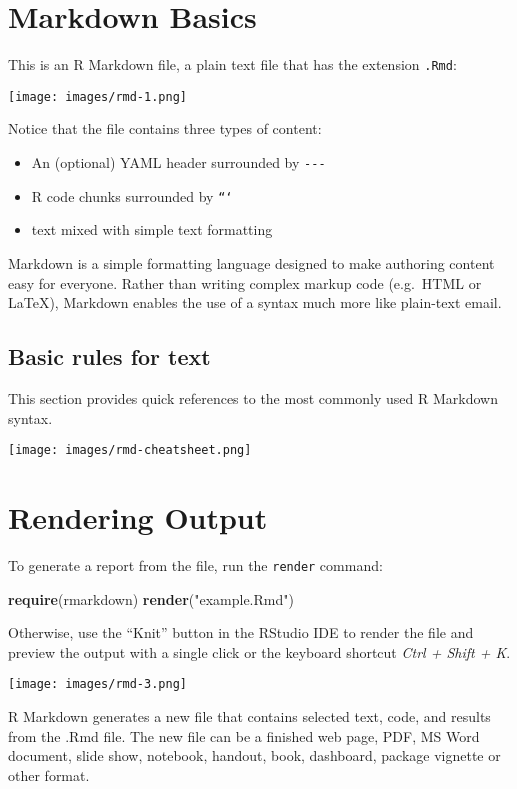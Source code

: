 \documentclass[]{book}
\newenvironment{Shaded}{\begin{snugshade}}{\end{snugshade}}
\newcommand{\KeywordTok}[1]{\textcolor[rgb]{0.13,0.29,0.53}{\textbf{{#1}}}}
\newcommand{\StringTok}[1]{\textcolor[rgb]{0.31,0.60,0.02}{{#1}}}
\newcommand{\NormalTok}[1]{{#1}}
\providecommand{\tightlist}{%
  \setlength{\itemsep}{0pt}\setlength{\parskip}{0pt}}
\def\tightlist{}
\begin{document}
\section{Markdown Basics}\label{markdown-basics}

This is an R Markdown file, a plain text file that has the extension
\texttt{.Rmd}:

\texttt{[image: images/rmd-1.png]}

Notice that the file contains three types of content:

\begin{itemize}
\tightlist
\item
  An (optional) YAML header surrounded by \texttt{-\/-\/-}
\item
  R code chunks surrounded by \texttt{```}
\item
  text mixed with simple text formatting
\end{itemize}

Markdown is a simple formatting language designed to make authoring
content easy for everyone. Rather than writing complex markup code
(e.g.~HTML or LaTeX), Markdown enables the use of a syntax much more
like plain-text email.

\subsection{Basic rules for text}\label{basic-rules-for-text}

This section provides quick references to the most commonly used R
Markdown syntax.

\texttt{[image: images/rmd-cheatsheet.png]}

\section{Rendering Output}\label{rendering-output}

To generate a report from the file, run the \texttt{render} command:

\begin{Shaded}
\begin{Highlighting}[]
\KeywordTok{require}\NormalTok{(rmarkdown)}
\KeywordTok{render}\NormalTok{(}\StringTok{"example.Rmd"}\NormalTok{)}
\end{Highlighting}
\end{Shaded}

Otherwise, use the ``Knit'' button in the RStudio IDE to render the file
and preview the output with a single click or the keyboard shortcut
\emph{Ctrl + Shift + K}.

\texttt{[image: images/rmd-3.png]}

R Markdown generates a new file that contains selected text, code, and
results from the .Rmd file. The new file can be a finished web page,
PDF, MS Word document, slide show, notebook, handout, book, dashboard,
package vignette or other format.
\end{document}
